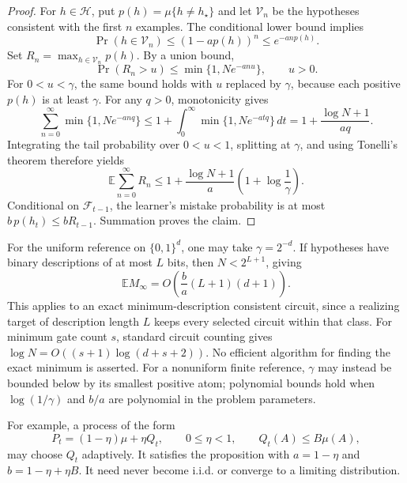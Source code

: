 \begin{proof}
For $h\in\mathcal H$, put $p(h)=\mu\{h\ne h_\star\}$ and let
$\mathcal V_n$ be the hypotheses consistent with the first $n$ examples.
The conditional lower bound implies
\[
 \Pr(h\in\mathcal V_n)\le(1-ap(h))^n\le e^{-anp(h)}.
\]
Set $R_n=\max_{h\in\mathcal V_n}p(h)$.  By a union bound,
\[
 \Pr(R_n>u)\le\min\{1,Ne^{-anu}\}, \qquad u>0.
\]
For $0<u<\gamma$, the same bound holds with $u$ replaced by $\gamma$,
because each positive $p(h)$ is at least $\gamma$.
For any $q>0$, monotonicity gives
\[
 \sum_{n=0}^{\infty}\min\{1,Ne^{-anq}\}
 \le 1+\int_0^\infty\min\{1,Ne^{-atq}\}\,dt
 =1+\frac{\log N+1}{aq}.
\]
Integrating the tail probability over $0<u<1$, splitting at $\gamma$,
and using Tonelli's theorem therefore yields
\[
 \mathbb E\sum_{n=0}^{\infty}R_n
 \le 1+\frac{\log N+1}{a}
                     \left(1+\log\frac1\gamma\right).
\]
Conditional on $\mathcal F_{t-1}$, the learner's mistake probability is
at most $b\,p(h_t)\le bR_{t-1}$.  Summation proves the claim.
\end{proof}

For the uniform reference on $\{0,1\}^d$, one may take
$\gamma=2^{-d}$.  If hypotheses have binary descriptions of at most $L$
bits, then $N<2^{L+1}$, giving
\[
 \mathbb E M_\infty
 =O\!\left(\frac ba(L+1)(d+1)\right).
\]
This applies to an exact minimum-description consistent circuit, since a
realizing target of description length $L$ keeps every selected circuit
within that class.  For minimum gate count $s$, standard circuit counting
gives $\log N=O((s+1)\log(d+s+2))$.  No efficient algorithm for finding the exact minimum
is asserted.  For a nonuniform finite reference, $\gamma$ may instead be
bounded below by its smallest positive atom; polynomial bounds hold when
$\log(1/\gamma)$ and $b/a$ are polynomial in the problem parameters.

For example, a process of the form
\[
 P_t=(1-\eta)\mu+\eta Q_t, \qquad 0\le\eta<1,
 \qquad Q_t(A)\le B\mu(A),
\]
may choose $Q_t$ adaptively.  It satisfies the proposition with
$a=1-\eta$ and $b=1-\eta+\eta B$.  It need never become i.i.d. or converge
to a limiting distribution.

